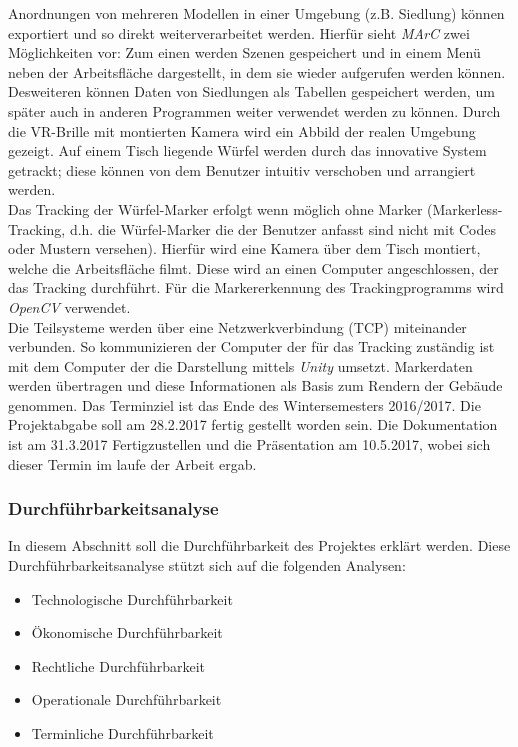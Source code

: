 Anordnungen von mehreren Modellen in einer Umgebung (z.B. Siedlung) können exportiert und so direkt weiterverarbeitet werden.
Hierfür sieht \textit{MArC} zwei Möglichkeiten vor: Zum einen werden Szenen gespeichert und in einem Menü neben der Arbeitsfläche dargestellt, in dem sie wieder aufgerufen werden können. Desweiteren können Daten von Siedlungen als Tabellen gespeichert werden, um später auch in anderen Programmen weiter verwendet werden zu können.
Durch die VR-Brille mit montierten Kamera wird ein Abbild der realen Umgebung gezeigt. Auf einem Tisch liegende Würfel werden durch das innovative System getrackt; diese können von dem Benutzer intuitiv verschoben und arrangiert werden. \\
Das Tracking der Würfel-Marker erfolgt wenn möglich ohne Marker (Markerless-Tracking, d.h. die Würfel-Marker die der Benutzer anfasst sind nicht mit Codes oder Mustern versehen). Hierfür wird eine Kamera über dem Tisch montiert, welche die Arbeitsfläche filmt. Diese wird an einen Computer angeschlossen, der das Tracking durchführt. Für die Markererkennung des Trackingprogramms wird \textit{OpenCV} verwendet.\\ Die Teilsysteme werden über eine Netzwerkverbindung (TCP) miteinander verbunden. So kommunizieren der Computer der für das Tracking zuständig ist mit dem Computer der die Darstellung mittels \textit{Unity} umsetzt. Markerdaten werden übertragen und diese Informationen als Basis zum Rendern der Gebäude genommen. 
Das Terminziel ist das Ende des Wintersemesters 2016/2017. Die Projektabgabe soll am 28.2.2017 fertig gestellt worden sein. Die Dokumentation ist am 31.3.2017 Fertigzustellen und die Präsentation am 10.5.2017, wobei sich dieser Termin im laufe der Arbeit ergab.

 
\subsubsection{Durchführbarkeitsanalyse}
In diesem Abschnitt soll die Durchführbarkeit des Projektes erklärt werden. Diese Durchführbarkeitsanalyse stützt sich auf die folgenden Analysen:
\begin{itemize}
	\item Technologische Durchführbarkeit
	\item  Ökonomische Durchführbarkeit
	\item Rechtliche Durchführbarkeit
	\item  Operationale Durchführbarkeit
	\item  Terminliche Durchführbarkeit
\end{itemize}


